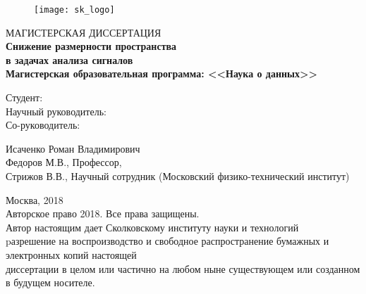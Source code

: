 \documentclass[12pt,oneside]{article}
\theoremstyle{definition}
\begin{document}
	\begin{figure}
		\vspace{1.7cm}
		\centering
		\texttt{[image: sk\_logo]}
	\end{figure}
	\begin{center}
		\sc 
			МАГИСТЕРСКАЯ ДИССЕРТАЦИЯ\\[5mm]
		\bf {\large
		Снижение размерности пространства \\в задачах анализа сигналов}\\[19mm]
		\rm
		Магистерская образовательная программа: <<Наука о данных>>\\[3mm]
	\end{center}
	\begin{minipage}{0.5\linewidth}
		\begin{flushright}
			Студент: \hphantom{1}\\[9mm]
			Научный руководитель: \hphantom{1}\\[9mm]
			Со-руководитель: \hphantom{1}\\
		\end{flushright}
	\end{minipage}%
	\begin{minipage}{0.48\linewidth}
		\vspace{.55cm}
		\begin{flushleft}
			Исаченко Роман Владимирович\\[9mm]
			Федоров М.В., Профессор, \\[9mm]
			Стрижов В.В., Научный сотрудник (Московский физико-технический институт)\\
		\end{flushleft}
	\end{minipage}%
	
	\vfill
	\begin{center}
		Москва, 2018 \\[9mm]
		\scriptsize{
			Авторское право 2018. Все права защищены. \\[7mm]
			
			Автор настоящим дает Сколковскому институту науки и технологий \\
			pазрешение на воспроизводство и свободное распространение бумажных и электронных копий настоящей \\ диссертации в целом или частично на любом ныне существующем или созданном в будущем носителе. \\[12mm]}
	\end{center}
\end{document}
